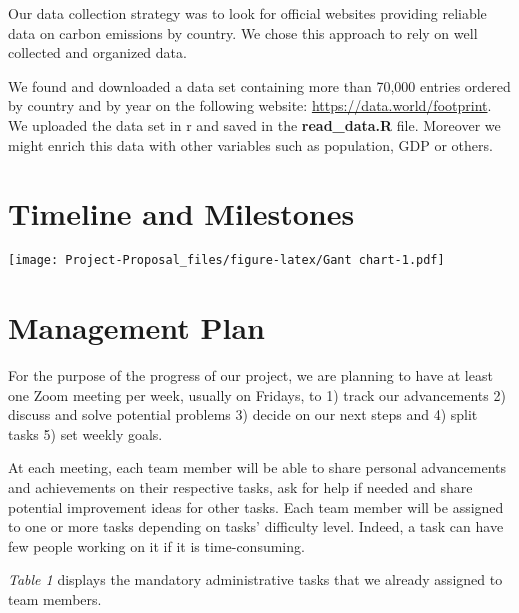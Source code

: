 \documentclass[
]{article}
\begin{document}
Our data collection strategy was to look for official websites providing
reliable data on carbon emissions by country. We chose this approach to
rely on well collected and organized data.

We found and downloaded a data set containing more than 70,000 entries
ordered by country and by year on the following website:
\url{https://data.world/footprint}. We uploaded the data set in r and
saved in the \textbf{read\_data.R} file. Moreover we might enrich this
data with other variables such as population, GDP or others.

\hypertarget{timeline-and-milestones}{%
\section{Timeline and Milestones}\label{timeline-and-milestones}}

\texttt{[image: Project-Proposal\_files/figure-latex/Gant chart-1.pdf]}

\hypertarget{management-plan}{%
\section{Management Plan}\label{management-plan}}

For the purpose of the progress of our project, we are planning to have
at least one Zoom meeting per week, usually on Fridays, to 1) track our
advancements 2) discuss and solve potential problems 3) decide on our
next steps and 4) split tasks 5) set weekly goals.

At each meeting, each team member will be able to share personal
advancements and achievements on their respective tasks, ask for help if
needed and share potential improvement ideas for other tasks. Each team
member will be assigned to one or more tasks depending on tasks'
difficulty level. Indeed, a task can have few people working on it if it
is time-consuming.

\emph{Table 1} displays the mandatory administrative tasks that we
already assigned to team members.
\end{document}
